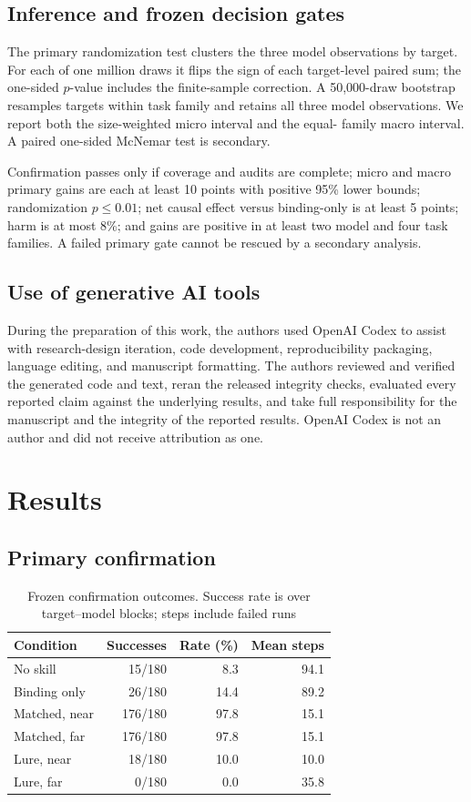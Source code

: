 \documentclass[pdflatex,sn-mathphys-num]{sn-jnl}
\begin{document}
\subsection{Inference and frozen decision gates}
The primary randomization test clusters the three model observations by target.
For each of one million draws it flips the sign of each target-level paired sum;
the one-sided $p$-value includes the finite-sample correction. A 50,000-draw
bootstrap resamples targets within task family and retains all three model
observations. We report both the size-weighted micro interval and the equal-
family macro interval. A paired one-sided McNemar test is secondary.

Confirmation passes only if coverage and audits are complete; micro and macro
primary gains are each at least 10 points with positive 95\% lower bounds;
randomization $p\le0.01$; net causal effect versus binding-only is at least 5
points; harm is at most 8\%; and gains are positive in at least two model and
four task families. A failed primary gate cannot be rescued by a secondary
analysis.

\subsection{Use of generative AI tools}
During the preparation of this work, the authors used OpenAI Codex to assist
with research-design iteration, code development, reproducibility packaging,
language editing, and manuscript formatting. The authors reviewed and verified
the generated code and text, reran the released integrity checks, evaluated
every reported claim against the underlying results, and take full
responsibility for the manuscript and the integrity of the reported results.
OpenAI Codex is not an author and did not receive attribution as one.

\section{Results}
\subsection{Primary confirmation}
\begin{table}[t]
\centering
\caption{Frozen confirmation outcomes. Success rate is over target--model
blocks; steps include failed runs}
\label{tab:main}
\begin{tabular}{lrrr}
\toprule
Condition & Successes & Rate (\%) & Mean steps \\
\midrule
No skill & 15/180 & 8.3 & 94.1 \\
Binding only & 26/180 & 14.4 & 89.2 \\
Matched, near & 176/180 & 97.8 & 15.1 \\
Matched, far & 176/180 & 97.8 & 15.1 \\
Lure, near & 18/180 & 10.0 & 10.0 \\
Lure, far & 0/180 & 0.0 & 35.8 \\
\bottomrule
\end{tabular}
\end{table}
\end{document}
